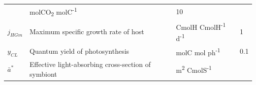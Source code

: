 \documentclass[]{elsarticle} %
\begin{document}
\begin{longtable}[c]{@{}llll@{}}
\begin{minipage}[t]{0.48\columnwidth}
\strut\end{minipage} &
\begin{minipage}[t]{0.25\columnwidth}\raggedright\strut
molCO\textsubscript{2} molC\textsuperscript{-1}
\strut\end{minipage} &
\begin{minipage}[t]{0.10\columnwidth}\raggedright\strut
10
\strut\end{minipage}\tabularnewline
\begin{minipage}[t]{0.10\columnwidth}\raggedright\strut
\(j_{HGm}\)
\strut\end{minipage} &
\begin{minipage}[t]{0.48\columnwidth}\raggedright\strut
Maximum specific growth rate of host
\strut\end{minipage} &
\begin{minipage}[t]{0.25\columnwidth}\raggedright\strut
CmolH CmolH\textsuperscript{-1} d\textsuperscript{-1}
\strut\end{minipage} &
\begin{minipage}[t]{0.10\columnwidth}\raggedright\strut
1
\strut\end{minipage}\tabularnewline
\begin{minipage}[t]{0.10\columnwidth}\raggedright\strut
\(y_{CL}\)
\strut\end{minipage} &
\begin{minipage}[t]{0.48\columnwidth}\raggedright\strut
Quantum yield of photosynthesis
\strut\end{minipage} &
\begin{minipage}[t]{0.25\columnwidth}\raggedright\strut
molC mol ph\textsuperscript{-1}
\strut\end{minipage} &
\begin{minipage}[t]{0.10\columnwidth}\raggedright\strut
0.1
\strut\end{minipage}\tabularnewline
\begin{minipage}[t]{0.10\columnwidth}\raggedright\strut
\(\bar{a}^*\)
\strut\end{minipage} &
\begin{minipage}[t]{0.48\columnwidth}\raggedright\strut
Effective light-absorbing cross-section of symbiont
\strut\end{minipage} &
\begin{minipage}[t]{0.25\columnwidth}\raggedright\strut
m\textsuperscript{2} CmolS\textsuperscript{-1}
\strut\end{minipage} &
\begin{minipage}[t]{0.10\columnwidth}\raggedright\strut

\end{minipage}
\end{longtable}
\end{document}
